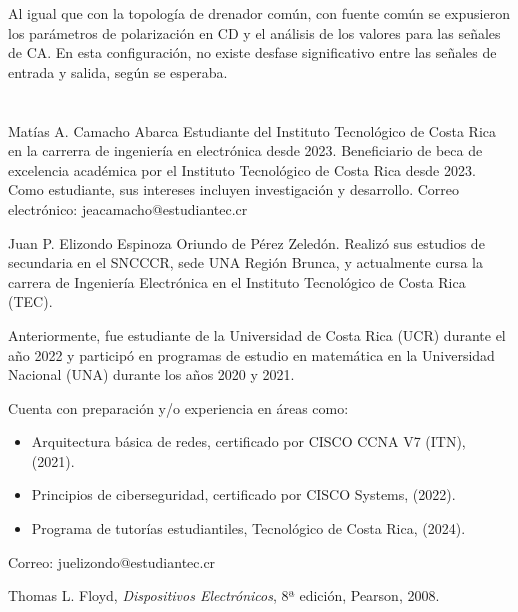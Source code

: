 \documentclass[journal]{IEEEtran}
\begin{document}
Al igual que con la topología de drenador común, con fuente común se expusieron los parámetros de polarización en CD
y el análisis de los valores para las señales de CA. En esta configuración, no existe desfase significativo entre las 
señales de entrada y salida, según se esperaba. 
\appendices

\section{}

\begin{IEEEbiographynophoto}{Matías A. Camacho Abarca}
        Estudiante del Instituto Tecnológico de Costa Rica en la carrerra de ingeniería en electrónica desde
        2023. Beneficiario de beca de excelencia académica por el Instituto Tecnológico de
        Costa Rica desde 2023. Como estudiante, sus
        intereses incluyen investigación y desarrollo.
        Correo electrónico: jeacamacho@estudiantec.cr
\end{IEEEbiographynophoto}

\begin{IEEEbiographynophoto}{Juan P. Elizondo Espinoza}
        Oriundo de Pérez Zeledón. Realizó sus estudios de secundaria en el SNCCCR, sede UNA Región Brunca, y actualmente cursa la carrera de Ingeniería Electrónica en el Instituto Tecnológico de Costa Rica (TEC). 
        
        Anteriormente, fue estudiante de la Universidad de Costa Rica (UCR) durante el año 2022 y participó en programas de estudio en matemática en la Universidad Nacional (UNA) durante los años 2020 y 2021. 
        
        Cuenta con preparación y/o experiencia en áreas como:
        \begin{itemize}
            \item Arquitectura básica de redes, certificado por CISCO CCNA V7 (ITN), (2021).
            \item Principios de ciberseguridad, certificado por CISCO Systems, (2022).
            \item Programa de tutorías estudiantiles, Tecnológico de Costa Rica, (2024).
        \end{itemize}
        
        Correo: juelizondo@estudiantec.cr
\end{IEEEbiographynophoto}


\begin{thebibliography}{11}
    Thomas L. Floyd, \emph{Dispositivos Electrónicos}, 8ª edición, Pearson, 2008.
\end{thebibliography}
\end{document}
